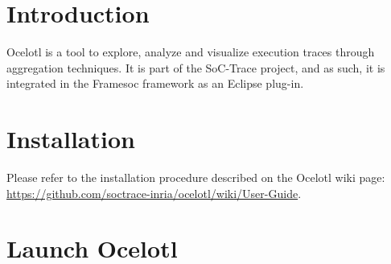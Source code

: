 \documentclass[twoside]{article}
\begin{document}
\begin{sloppypar} %


\newcommand{\parag}[1]{\paragraph{#1}\mbox{}\\}
\newcommand{\subparag}[1]{\subparagraph{#1}\mbox{}\\}
\newcommand{\subsubparag}[1]{\subparagraph{#1}}
\renewcommand{\labelitemi}{$\bullet$}
\renewcommand{\labelitemii}{$\circ$}

\makeRT 

\renewcommand{\contentsname}{Table of contents}
\tableofcontents
\newpage
\section{Introduction}
\label{intro}


Ocelotl is a tool to explore, analyze and visualize execution traces through aggregation techniques. It is part of the SoC-Trace project, and as such, it is integrated in the Framesoc framework as an Eclipse plug-in. 

\section{Installation}
Please refer to the installation procedure described on the Ocelotl wiki page: \url{https://github.com/soctrace-inria/ocelotl/wiki/User-Guide}.

\section{Launch Ocelotl}


\end{sloppypar}
\end{document}
